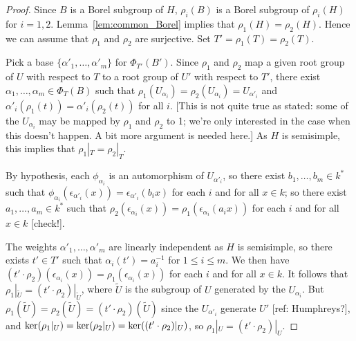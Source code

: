 \documentclass[12pt]{amsart}
\newcommand\ra{\rightarrow}
\numberwithin{equation}{section}
\theoremstyle{definition}
\theoremstyle{remark}
\theoremstyle{remark}
\begin{document}
\begin{proof}
 Since $B$ is a Borel subgroup of $H$, $\rho_i(B)$ is a Borel subgroup of $\rho_i(H)$ for $i= 1,2$.  Lemma~\ref{lem:common_Borel} implies that $\rho_1(H)= \rho_2(H)$.  Hence we can assume that $\rho_1$ and $\rho_2$ are surjective.  Set $T'= \rho_1(T)= \rho_2(T)$.
 
 
 Pick a base $\{\alpha'_1,\ldots, \alpha'_m\}$ for $\Phi_{T'}(B')$.  Since $\rho_1$ and $\rho_2$ map a given root group of $U$ with respect to $T$ to a root group of $U'$ with respect to $T'$, there exist $\alpha_1,\ldots, \alpha_m\in \Phi_T(B)$ such that $\rho_1(U_{\alpha_i})= \rho_2(U_{\alpha_i})= U_{\alpha'_i}$ and $\alpha'_i(\rho_1(t))= \alpha'_i(\rho_2(t))$ for all $i$.  [This is not quite true as stated: some of the $U_{\alpha_i}$ may be mapped by $\rho_1$ and $\rho_2$ to 1; we're only interested in the case when this doesn't happen.  A bit more argument is needed here.]  As $H$ is semisimple, this implies that $\rho_1|_T= \rho_2|_T$.
 
 By hypothesis, each $\phi_{\alpha_i}$ is an automorphism of $U_{\alpha'_i}$, so there exist $b_1,\ldots, b_m\in k^*$ such that $\phi_{\alpha_i}(\epsilon_{\alpha'_i}(x))= \epsilon_{\alpha'_i}(b_ix)$ for each $i$ and for all $x\in k$; so there exist $a_1,\ldots, a_m\in k^*$ such that $\rho_2(\epsilon_{\alpha_i}(x))= \rho_1(\epsilon_{\alpha_i}(a_ix))$ for each $i$ and for all $x\in k$ [check!].
 
 The weights $\alpha'_1,\ldots, \alpha'_m$ are linearly independent as $H$ is semisimple, so there exists $t'\in T'$ such that $\alpha_i(t')= a_i^{-1}$ for $1\leq i\leq m$.  We then have $(t'\cdot \rho_2)(\epsilon_{\alpha_i}(x))= \rho_1(\epsilon_{\alpha_i}(x))$ for each $i$ and for all $x\in k$.  It follows that $\rho_1|_{\widetilde{U}}= (t'\cdot \rho_2)|_{\widetilde{U}}$, where $\widetilde{U}$ is the subgroup of $U$ generated by the $U_{\alpha_i}$.  But $\rho_1(\widetilde{U})= \rho_2(\widetilde{U})= (t'\cdot \rho_2)(\widetilde{U})$ since the $U_{\alpha'_i}$ generate $U'$ [ref: Humphreys?], and ${\rm ker}(\rho_1|_U)= {\rm ker}(\rho_2|_U)= {\rm ker}((t'\cdot \rho_2)|_U)$, so $\rho_1|_U= (t'\cdot \rho_2)|_U$.
 

\end{proof}
\end{document}
